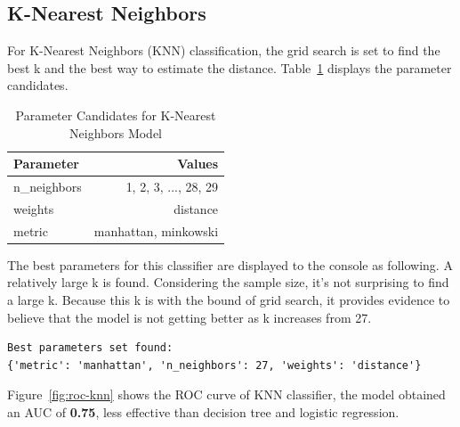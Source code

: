 \subsection{K-Nearest Neighbors}

For K-Nearest Neighbors (KNN) classification, the grid search is set to find the best k and the best way to estimate the distance. Table~\ref{tab:parameters-knn} displays the parameter candidates.

\begin{table}[h]
\centering
\begin{tabular}{|l|r|}
\hline
\textbf{Parameter} & \textbf{Values}                                \\ \hline
n\_neighbors       & 1, 2, 3, ..., 28, 29                           \\ \hline
weights            & distance                                       \\ \hline
metric             & manhattan, minkowski                           \\ \hline
\end{tabular}
\caption{Parameter Candidates for K-Nearest Neighbors Model}
\label{tab:parameters-knn}
\end{table}


The best parameters for this classifier are displayed to the console as following. A relatively large k is found. Considering the sample size, it's not surprising to find a large k. Because this k is with the bound of grid search, it provides evidence to believe that the model is not getting better as k increases from 27.

\begin{verbatim}
Best parameters set found:
{'metric': 'manhattan', 'n_neighbors': 27, 'weights': 'distance'}
\end{verbatim}

Figure~\ref{fig:roc-knn} shows the ROC curve of KNN classifier, the model obtained an AUC of \textbf{0.75}, less effective than decision tree and logistic regression.

